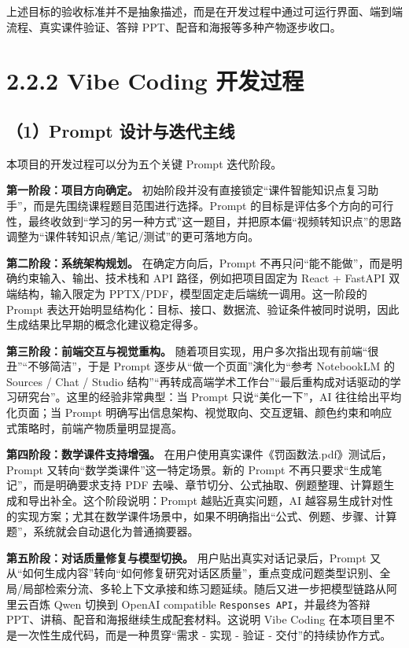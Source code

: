 \documentclass[UTF8,zihao=-4]{ctexart}
\begin{document}
上述目标的验收标准并不是抽象描述，而是在开发过程中通过可运行界面、端到端流程、真实课件验证、答辩 PPT、配音和海报等多种产物逐步收口。

\section{2.2.2 Vibe Coding 开发过程}

\subsection*{（1）Prompt 设计与迭代主线}
本项目的开发过程可以分为五个关键 Prompt 迭代阶段。

\textbf{第一阶段：项目方向确定。} 初始阶段并没有直接锁定“课件智能知识点复习助手”，而是先围绕课程题目范围进行选择。Prompt 的目标是评估多个方向的可行性，最终收敛到“学习的另一种方式”这一题目，并把原本偏“视频转知识点”的思路调整为“课件转知识点/笔记/测试”的更可落地方向。

\textbf{第二阶段：系统架构规划。} 在确定方向后，Prompt 不再只问“能不能做”，而是明确约束输入、输出、技术栈和 API 路径，例如把项目固定为 React + FastAPI 双端结构，输入限定为 PPTX/PDF，模型固定走后端统一调用。这一阶段的 Prompt 表达开始明显结构化：目标、接口、数据流、验证条件被同时说明，因此生成结果比早期的概念化建议稳定得多。

\textbf{第三阶段：前端交互与视觉重构。} 随着项目实现，用户多次指出现有前端“很丑”“不够简洁”，于是 Prompt 逐步从“做一个页面”演化为“参考 NotebookLM 的 Sources / Chat / Studio 结构”“再转成高端学术工作台”“最后重构成对话驱动的学习研究台”。这里的经验非常典型：当 Prompt 只说“美化一下”，AI 往往给出平均化页面；当 Prompt 明确写出信息架构、视觉取向、交互逻辑、颜色约束和响应式策略时，前端产物质量明显提高。

\textbf{第四阶段：数学课件支持增强。} 在用户使用真实课件《罚函数法.pdf》测试后，Prompt 又转向“数学类课件”这一特定场景。新的 Prompt 不再只要求“生成笔记”，而是明确要求支持 PDF 去噪、章节切分、公式抽取、例题整理、计算题生成和导出补全。这个阶段说明：Prompt 越贴近真实问题，AI 越容易生成针对性的实现方案；尤其在数学课件场景中，如果不明确指出“公式、例题、步骤、计算题”，系统就会自动退化为普通摘要器。

\textbf{第五阶段：对话质量修复与模型切换。} 用户贴出真实对话记录后，Prompt 又从“如何生成内容”转向“如何修复研究对话区质量”，重点变成问题类型识别、全局/局部检索分流、多轮上下文承接和练习题延续。随后又进一步把模型链路从阿里云百炼 Qwen 切换到 OpenAI compatible \texttt{Responses API}，并最终为答辩 PPT、讲稿、配音和海报继续生成配套材料。这说明 Vibe Coding 在本项目里不是一次性生成代码，而是一种贯穿“需求 - 实现 - 验证 - 交付”的持续协作方式。
\end{document}
